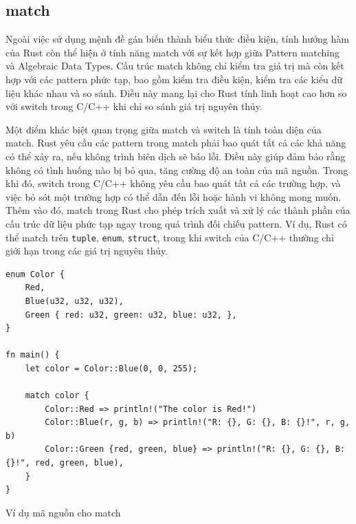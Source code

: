 \subsection{match}

Ngoài việc sử dụng mệnh đề gán biến thành biểu thức điều kiện, tính hướng hàm của Rust còn thể hiện ở tính năng match với sự kết hợp giữa Pattern matching và Algebraic Data Types.
Cấu trúc match không chỉ kiểm tra giá trị mà còn kết hợp với các pattern phức tạp, bao gồm kiểm tra điều kiện, kiểm tra các kiểu dữ liệu khác nhau và so sánh.
Điều này mang lại cho Rust tính linh hoạt cao hơn so với switch trong C/C++ khi chỉ so sánh giá trị nguyên thủy.

Một điểm khác biệt quan trọng giữa match và switch là tính toàn diện của match.
Rust yêu cầu các pattern trong match phải bao quát tất cả các khả năng có thể xảy ra, nếu không trình biên dịch sẽ báo lỗi.
Điều này giúp đảm bảo rằng không có tình huống nào bị bỏ qua, tăng cường độ an toàn của mã nguồn.
Trong khi đó, switch trong C/C++ không yêu cầu bao quát tất cả các trường hợp, và việc bỏ sót một trường hợp có thể dẫn đến lỗi hoặc hành vi không mong muốn.
Thêm vào đó, match trong Rust cho phép trích xuất và xử lý các thành phần của cấu trúc dữ liệu phức tạp ngay trong quá trình đối chiếu pattern.
Ví dụ, Rust có thể match trên \texttt{tuple}, \texttt{enum}, \texttt{struct}, trong khi switch của C/C++ thường chỉ giới hạn trong các giá trị nguyên thủy.

\begin{listing}[H]
\begin{verbatim}
enum Color {
    Red,
    Blue(u32, u32, u32),
    Green { red: u32, green: u32, blue: u32, },
}

fn main() {
    let color = Color::Blue(0, 0, 255);

    match color {
        Color::Red => println!("The color is Red!")
        Color::Blue(r, g, b) => println!("R: {}, G: {}, B: {}!", r, g, b)
        Color::Green {red, green, blue} => println!("R: {}, G: {}, B: {}!", red, green, blue),
    }
}
\end{verbatim}
\caption{Ví dụ mã nguồn cho match}
\label{code:c4_match}
\end{listing}

